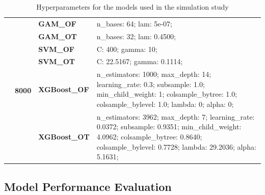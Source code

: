 \documentclass[runningheads]{llncs}
\begin{document}
\begin{table}
\begin{tabularx}{\textwidth}{>{\RaggedRight\arraybackslash}m{1.6cm}p{1.225cm}p{2.05cm}>{\RaggedRight\arraybackslash}X}
        \cline{2-4}
        \textbf{}                               & \multirow[t]{7}{*}{\textbf{8000}} & \textbf{GAM\_OF}     & n\_bases: 64; lam: 5e-07;                                                                                                                                                                         \\
        \textbf{}                               & \textbf{}                         & \textbf{GAM\_OT}     & n\_bases: 32; lam: 0.4500;                                                                                                                                                                        \\
        \textbf{}                               & \textbf{}                         & \textbf{SVM\_OF}     & C: 400; gamma: 10;                                                                                                                                                                                \\
        \textbf{}                               & \textbf{}                         & \textbf{SVM\_OT}     & C: 22.5167; gamma: 0.1114;                                                                                                                                                                        \\
        \textbf{}                               & \textbf{}                         & \textbf{XGBoost\_OF} & n\_estimators: 1000; max\_depth: 14; learning\_rate: 0.3; subsample: 1.0; min\_child\_weight: 1; colsample\_bytree: 1.0; colsample\_bylevel: 1.0; lambda: 0; alpha: 0;                            \\
        \textbf{}                               & \textbf{}                         & \textbf{XGBoost\_OT} & n\_estimators: 3962; max\_depth: 7; learning\_rate: 0.0372; subsample: 0.9351; min\_child\_weight: 4.0962; colsample\_bytree: 0.8640; colsample\_bylevel: 0.7728; lambda: 29.2036; alpha: 5.1631; \\
        \bottomrule
    \end{tabularx}
    \caption{Hyperparameters for the models used in the simulation study}
    \label{tab:model-hyperparameters}
\end{table}

\subsection{Model Performance Evaluation}
\end{document}
